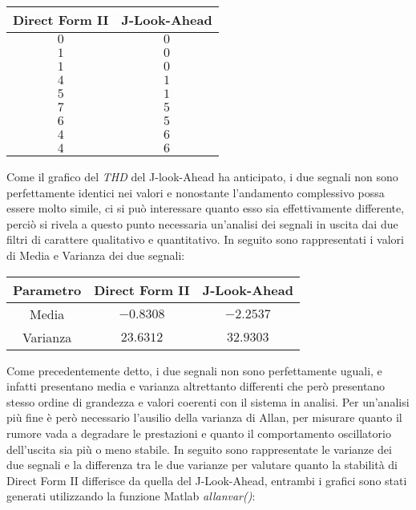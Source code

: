 \begin{table}[H]
\begin{center}
\begin{tabular}{|c|c|}
\hline
Direct Form II	& J-Look-Ahead 			\\ \hline
$0$  			& $0$                 	\\ \hline
$1$      		& $0$                 	\\ \hline
$1$     		& $0$                 	\\ \hline
$4$      		& $1$                  	\\ \hline
$5$      		& $1$                  	\\ \hline
$7$      		& $5$                 	\\ \hline
$6$     		& $5$                   \\ \hline
$4$      		& $6$                   \\ \hline
$4$      		& $6$                   \\ \hline
\end{tabular}
\end{center}
\end{table}

Come il grafico del \textit{THD} del J-look-Ahead ha anticipato, i due segnali non sono perfettamente identici nei valori e nonostante l'andamento complessivo possa essere molto simile, ci si può interessare quanto esso sia effettivamente differente, perciò si rivela a questo punto necessaria un'analisi dei segnali in uscita dai due filtri di carattere qualitativo e quantitativo. In seguito sono rappresentati i valori di Media e Varianza dei due segnali:

\begin{table}[H]
\begin{center}
\begin{tabular}{|c|c|c|}
\hline
Parametro		& Direct Form II	& J-Look-Ahead 			\\ \hline
Media			&$-0.8308$  		& $-2.2537$	           	\\ \hline
Varianza		&$23.6312$      	& $32.9303$             \\ \hline

\end{tabular}
\end{center}
\end{table}

Come precedentemente detto, i due segnali non sono perfettamente uguali, e infatti presentano media e varianza altrettanto differenti che però presentano  stesso ordine di grandezza e valori coerenti con il sistema in analisi. Per un'analisi più fine è però necessario l'ausilio della varianza di Allan, per misurare quanto il rumore vada a degradare le prestazioni e quanto il comportamento oscillatorio dell'uscita sia più o meno stabile. In seguito sono rappresentate le varianze dei due segnali e la differenza tra le due varianze per valutare quanto la stabilità di Direct Form II differisce da quella del J-Look-Ahead, entrambi i grafici sono stati generati utilizzando la funzione Matlab \textit{allanvar()}:

